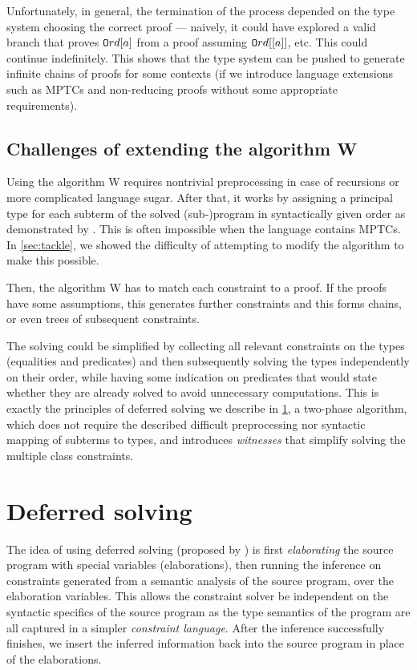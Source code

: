 Unfortunately, in general, the termination of the process depended on the type system choosing the correct proof --- naively, it could have explored a valid branch that proves $\mathtt{O}rd [a]$ from a proof assuming $\mathtt{O}rd [[a]]$, etc. This could continue indefinitely. This shows that the type system can be pushed to generate infinite chains of proofs for some contexts (if we introduce language extensions such as MPTCs and non-reducing proofs without some appropriate requirements).

\subsection{Challenges of extending the algorithm W}


Using the algorithm W requires nontrivial preprocessing in case of recursions or more complicated language sugar. After that, it works by assigning a principal type for each subterm of the solved (sub-)program in syntactically given order as demonstrated by \citet{jones1999typing}. This is often impossible when the language contains MPTCs. In \cref{sec:tackle}, we showed the difficulty of attempting to modify the algorithm to make this possible.

Then, the algorithm W has to match each constraint to a proof. If the proofs have some assumptions, this generates further constraints and this forms chains, or even trees of subsequent constraints.

The solving could be simplified by collecting all relevant constraints on the types (equalities and predicates) and then subsequently solving the types independently on their order, while having some indication on predicates that would state whether they are already solved to avoid unnecessary computations. This is exactly the principles of deferred solving we describe in \cref{defer_solve}, a two-phase algorithm, which does not require the described difficult preprocessing nor syntactic mapping of subterms to types, and introduces \emph{witnesses} that simplify solving the multiple class constraints.

\section{Deferred solving}
\label{defer_solve}

The idea of using deferred solving (proposed by \citet{vytiniotis2011outsidein}) is first \emph{elaborating} the source program with special variables (elaborations), then running the inference on constraints generated from a semantic analysis of the source program, over the elaboration variables. This allows the constraint solver be independent on the syntactic specifics of the source program as the type semantics of the program are all captured in a simpler \emph{constraint language}. After the inference successfully finishes, we insert the inferred information back into the source program in place of the elaborations.

